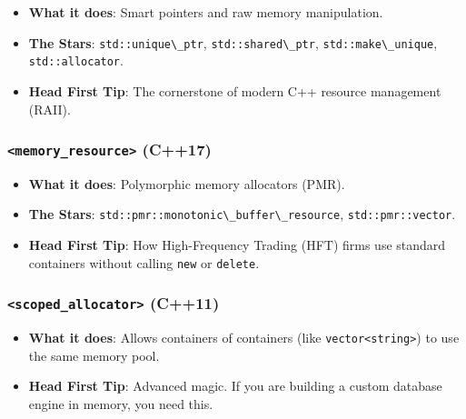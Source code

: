 \begin{itemize}
\tightlist
\item
  \textbf{What it does}: Smart pointers and raw memory manipulation.
\item
  \textbf{The Stars}: \passthrough{\lstinline!std::unique\_ptr!},
  \passthrough{\lstinline!std::shared\_ptr!},
  \passthrough{\lstinline!std::make\_unique!},
  \passthrough{\lstinline!std::allocator!}.
\item
  \textbf{Head First Tip}: The cornerstone of modern C++ resource
  management (RAII).
\end{itemize}

\hypertarget{memory_resource-c17}{%
\subsubsection{\texorpdfstring{\texttt{\textless{}memory\_resource\textgreater{}}
(C++17)}{\textless memory\_resource\textgreater{} (C++17)}}\label{memory_resource-c17}}

\begin{itemize}
\tightlist
\item
  \textbf{What it does}: Polymorphic memory allocators (PMR).
\item
  \textbf{The Stars}:
  \passthrough{\lstinline!std::pmr::monotonic\_buffer\_resource!},
  \passthrough{\lstinline!std::pmr::vector!}.
\item
  \textbf{Head First Tip}: How High-Frequency Trading (HFT) firms use
  standard containers without calling \passthrough{\lstinline!new!} or
  \passthrough{\lstinline!delete!}.
\end{itemize}

\hypertarget{scoped_allocator-c11}{%
\subsubsection{\texorpdfstring{\texttt{\textless{}scoped\_allocator\textgreater{}}
(C++11)}{\textless scoped\_allocator\textgreater{} (C++11)}}\label{scoped_allocator-c11}}

\begin{itemize}
\tightlist
\item
  \textbf{What it does}: Allows containers of containers (like
  \passthrough{\lstinline!vector<string>!}) to use the same memory pool.
\item
  \textbf{Head First Tip}: Advanced magic. If you are building a custom
  database engine in memory, you need this.
\end{itemize}


